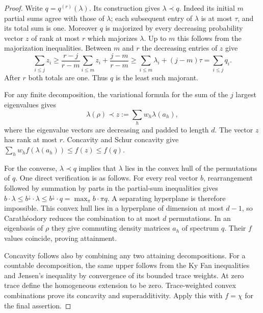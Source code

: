 \begin{proof}
Write $q=q^{(r)}(\lambda)$.  Its construction gives $\lambda\prec q$.
Indeed its initial $m$ partial sums agree with those of $\lambda$;
each subsequent entry of $\lambda$ is at most $\tau$, and its total
sum is one.  Moreover $q$ is majorized by every decreasing probability
vector $z$ of rank at most $r$ which majorizes $\lambda$.  Up to $m$
this follows from the majorization inequalities.  Between $m$ and $r$
the decreasing entries of $z$ give
\[
 \sum_{i\le j}z_i\ge
 \frac{r-j}{r-m}\sum_{i\le m}z_i+\frac{j-m}{r-m}
 \ge\sum_{i\le m}\lambda_i+(j-m)\tau
                   =\sum_{i\le j}q_i.
\]
After $r$ both totals are one.  Thus $q$ is the least such majorant.

For any finite decomposition, the variational formula for the sum of
the $j$ largest eigenvalues gives
\[
 \lambda(\rho)\prec z:=\sum_hw_h\lambda(a_h),
\]
where the eigenvalue vectors are decreasing and padded to length $d$.
The vector $z$ has rank at most $r$.  Concavity and Schur concavity give
$\sum_hw_hf(\lambda(a_h))\le f(z)\le f(q)$.

For the converse, $\lambda\prec q$ implies that $\lambda$ lies in the
convex hull of the permutations of $q$.  One direct verification is
as follows.  For every real vector $b$, rearrangement followed by
summation by parts in the partial-sum inequalities gives
$b\cdot\lambda\le b^\downarrow\cdot\lambda
 \le b^\downarrow\cdot q=\max_\pi b\cdot\pi q$.
A separating hyperplane is therefore impossible.  This convex hull
lies in a hyperplane of dimension at most $d-1$, so Carath\'eodory
reduces the combination to at most $d$ permutations.  In an eigenbasis
of $\rho$ they give commuting density matrices $a_h$ of spectrum $q$.
Their $f$ values coincide, proving attainment.

Concavity follows also by combining any two attaining decompositions.
For a countable decomposition, the same upper follows from the Ky Fan
inequalities and Jensen's inequality by convergence of its bounded
trace weights.  At zero trace define the homogeneous extension to be
zero.  Trace-weighted convex combinations prove its concavity and
superadditivity.  Apply this with $f=\chi$ for the final assertion.
\end{proof}

